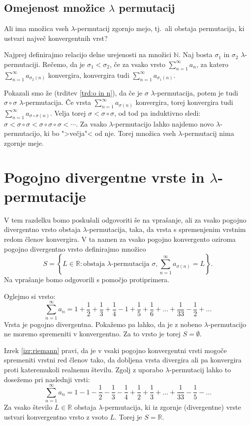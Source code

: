 \documentclass[12pt,a4paper,reqno]{amsart}
\theoremstyle{definition} %
\theoremstyle{plain} %
\begin{document}
\subsection{Omejenost množice $\lambda$ permutacij}

Ali ima množica vseh $\lambda$-permutacij zgornjo mejo, tj.\ ali obstaja permutacija, ki ustvari največ konvergentnih vrst?

Najprej definirajmo relacijo delne urejenosti na množici $ \mathbb{N}$. Naj bosta $\sigma _1$ in $\sigma _2$ $\lambda$-permutaciji. Rečemo, da je $\sigma_1 < \sigma_2$, če za vsako vrsto $\sum^{\infty}_{n=1}a_n$, za katero $\sum^{\infty}_{n=1}a_{\sigma_2(n)}$ konvergira, konvergira tudi $\sum^{\infty}_{n=1}a_{\sigma_1(n)}$. 

Pokazali smo že (trditev \ref{trd:o in n}), da če je $\sigma$ $\lambda$-permutacija, potem je tudi $\sigma \circ \sigma$  $\lambda$-permutacija. Če vrsta $\sum^{\infty}_{n=1}a_{\sigma(n)}$ konvergira, torej konvergira tudi $\sum^{\infty}_{n=1}a_{\sigma \circ \sigma(n)}$. Velja torej $\sigma < \sigma \circ \sigma$, od tod pa induktivno sledi: $\sigma < \sigma \circ \sigma < \sigma \circ \sigma \circ \sigma < \cdots$. Za vsako $\lambda$-permutacijo lahko najdemo novo $\lambda$-permutacijo, ki bo ">večja"< od nje. Torej množica vseh $\lambda$-permutacij nima zgornje meje. 


\section{Pogojno divergentne vrste in $\lambda$-permutacije}

V tem razdelku bomo poskušali odgovoriti še na vprašanje, ali za vsako pogojno divergentno vrsto obstaja $\lambda$-permutacija, taka, da vrsta s spremenjenim vrstnim redom členov konvergira. V ta namen za vsako pogojno konvergento oziroma pogojno divergentno vrsto definirajmo množico $$S=\left \{L\in \mathbb{R}:\textrm{obstaja }\lambda \textrm{-permutacija } \sigma, \sum^{\infty}_{n=1}a_{\sigma (n)}=L\right \}.$$ Na vprašanje bomo odgovorili s pomočjo protiprimera.

Oglejmo si vrsto:
$$\sum^{\infty}_{n=1}a_n = 1+\frac{1}{2}+\frac{1}{3}+\frac{1}{4}-1+\frac{1}{5}+\frac{1}{6}+ \dots +\frac{1}{33}-\frac{1}{2}+\dots$$
Vrsta je pogojno divergentna. Pokažemo pa lahko, da je z nobeno $\lambda$-permutacijo ne moremo spremeniti v konvergentno. Za to vrsto je torej $S=\emptyset$. 

Izrek \ref{izr:riemann} pravi, da je v vsaki pogojno konvergentni vrsti mogoče spremeniti vrstni red členov tako, da dobljena vrsta divergira ali pa konvergira proti kateremukoli realnemu številu. Zgolj z uporabo $\lambda$-permutacij lahko to dosežemo pri naslednji vrsti:
$$\sum^{\infty}_{n=1}a_n= 1-1-\frac{1}{2}-\frac{1}{3}-\frac{1}{4}+\frac{1}{2}+\frac{1}{3}+\dots +\frac{1}{33}-\frac{1}{5}-\dots $$
Za vsako število $L\in \mathbb{R}$ obstaja $\lambda$-permutacija, ki iz zgornje (divergentne) vrste ustvari konvergentno vrsto z vsoto $L$. Torej je $S=\mathbb{R}$.
\end{document}
